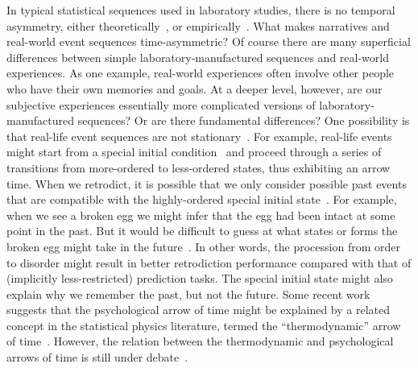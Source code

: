 \documentclass[10pt]{article}
\begin{document}
In typical statistical sequences used in laboratory studies, there is no temporal asymmetry, either theoretically~\citep{Cove94, BialEtal01, ElliEtal09}, or empirically~\citep{JonePash07}. What makes narratives and real-world event sequences time-asymmetric? Of course there are many superficial differences between simple laboratory-manufactured sequences and real-world experiences. As one example, real-world experiences often involve other people who have their own memories and goals. At a deeper level, however, are our subjective experiences essentially more complicated versions of laboratory-manufactured sequences? Or are there fundamental differences? One possibility is that real-life event sequences are not stationary~\citep[i.e., not in equilibrium; ][]{Cove94}. For example, real-life events might start from a special initial condition~\citep{Albe00, Feyn65, Cove94} and proceed through a series of transitions from more-ordered to less-ordered states, thus exhibiting an arrow time. When we retrodict, it is possible that we only consider possible past events that are compatible with the highly-ordered special initial state~\citep{Carr10, Carr16}. For example, when we see a broken egg we might infer that the egg had been intact at some point in the past. But it would be difficult to guess at what states or forms the broken egg might take in the future~\citep{Carr10, Carr16}. In other words, the procession from order to disorder might result in better retrodiction performance compared with that of (implicitly less-restricted) prediction tasks. The special initial state might also explain why we remember the past, but not the future. Some recent work suggests that the psychological arrow of time might be explained by a related concept in the statistical physics literature, termed the ``thermodynamic'' arrow of time~\citep{MlodBrun14, Rove22}. However, the relation between the thermodynamic and psychological arrows of time is still under debate~\citep{Golo21, HemmShen19}.
\end{document}
